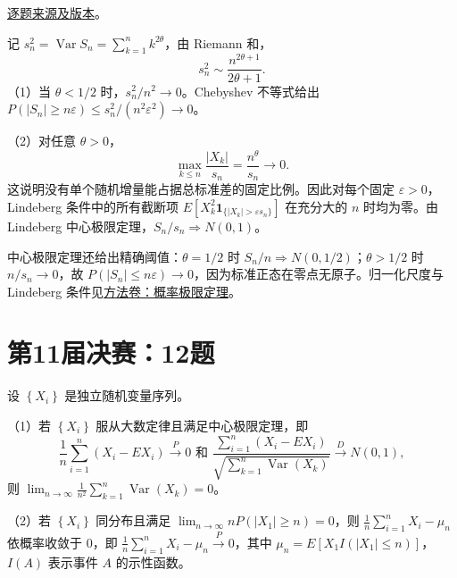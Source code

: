 \documentclass[UTF8,12pt,a4paper,fontset=fandol]{ctexbook}
\begin{document}
\href{https://github.com/lzxcr/cmc-mathematics/blob/64916fa1fdbc3e444a652eca204d5669058ee321/src/problems/finals/10/15.md}{逐题来源及版本}。

\begin{solve}

记 $s_n^2=\operatorname{Var}S_n=\sum_{k=1}^nk^{2\theta}$，由 Riemann 和，
\[
s_n^2\sim\frac{n^{2\theta+1}}{2\theta+1}.
\]
（1）当 $\theta<1/2$ 时，$s_n^2/n^2\to0$。Chebyshev 不等式给出 $P(|S_n|\geq n\varepsilon)\leq s_n^2/(n^2\varepsilon^2)\to0$。

（2）对任意 $\theta>0$，
\[
\max_{k\leq n}\frac{|X_k|}{s_n}=\frac{n^\theta}{s_n}\longrightarrow0.
\]
这说明没有单个随机增量能占据总标准差的固定比例。因此对每个固定 $\varepsilon>0$，Lindeberg 条件中的所有截断项 $E[X_k^2\mathbf1_{\{|X_k|>\varepsilon s_n\}}]$ 在充分大的 $n$ 时均为零。由 Lindeberg 中心极限定理，$S_n/s_n\Rightarrow N(0,1)$。

\end{solve}

\begin{remark}[方法与条件]

中心极限定理还给出精确阈值：$\theta=1/2$ 时 $S_n/n\Rightarrow N(0,1/2)$；$\theta>1/2$ 时 $n/s_n\to0$，故 $P(|S_n|\leq n\varepsilon)\to0$，因为标准正态在零点无原子。归一化尺度与 Lindeberg 条件见\hyperref[app:probability-limit]{方法卷：概率极限定理}。

\end{remark}

\section{第11届决赛：12题}\label{pr:fin11-high:12}

\begin{example}[公开题解转录]\label{q:fin11-high:12}

设 $\left\{X_{i}\right\}$ 是独立随机变量序列。

（1）若 $\left\{X_{i}\right\}$ 服从大数定律且满足中心极限定理，即
\[
\frac{1}{n}\sum_{i=1}^{n}\left(X_{i}-EX_{i}\right)\overset{P}{\rightarrow}0 \text{ 和 } \frac{\sum_{i=1}^{n}\left(X_{i}-EX_{i}\right)}{\sqrt{\sum_{k=1}^{n}\operatorname{Var}\left(X_{k}\right)}}\overset{D}{\rightarrow}N(0,1),
\]
则 $\lim_{n\to\infty}\frac{1}{n^{2}}\sum_{k=1}^{n}\operatorname{Var}\left(X_{k}\right)=0$。

（2）若 $\left\{X_{i}\right\}$ 同分布且满足 $\lim_{n\to\infty}nP\left(\left|X_{1}\right|\geq n\right)=0$，则 $\frac{1}{n}\sum_{i=1}^{n}X_{i}-\mu_{n}$ 依概率收敛于 0，即 $\frac{1}{n}\sum_{i=1}^{n}X_{i}-\mu_{n}\overset{P}{\rightarrow}0$，其中 $\mu_{n}=E\left[X_{1}I\left(\left|X_{1}\right|\leq n\right)\right]$，$I(A)$ 表示事件 $A$ 的示性函数。

\end{example}
\end{document}
